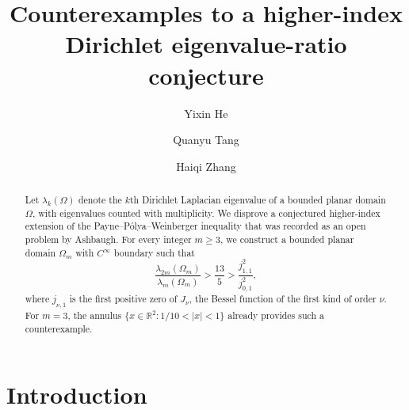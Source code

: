 \documentclass[11pt,letterpaper,reqno]{amsart}
\theoremstyle{definition}
\begin{document}
\title[Higher-index Dirichlet eigenvalue ratios]{Counterexamples to a higher-index Dirichlet eigenvalue-ratio conjecture}

\author[Y.~He]{Yixin He}
\address{School of Mathematical Sciences, Fudan University,
Shanghai 200433, P.~R.~China}

\author[Q.~Tang]{Quanyu Tang}
\address{School of Mathematical Sciences, University of Science and Technology
of China, Hefei 230026, P.~R.~China}

\author[H.~Zhang]{Haiqi Zhang}
\address{School of Mathematics, Shandong University, Jinan 250100, P.~R.~China}



\begin{abstract}
Let $\lambda_k(\Omega)$ denote the $k$th Dirichlet Laplacian eigenvalue of a bounded planar domain $\Omega$, with eigenvalues counted with multiplicity.  We disprove a conjectured higher-index extension of the Payne--P\'olya--Weinberger inequality that was recorded as an open problem by Ashbaugh. For every integer $m\geq3$, we construct a bounded planar domain $\Omega_m$ with $C^\infty$ boundary such that
$$
\frac{\lambda_{2m}(\Omega_m)}{\lambda_m(\Omega_m)}
>\frac{13}{5}
>\frac{j_{1,1}^2}{j_{0,1}^2},
$$
where $j_{\nu,1}$ is the first positive zero of $J_\nu$, the Bessel function of the first kind of order $\nu$. For $m=3$, the annulus $\{x\in\mathbb{R}^2:1/10<|x|<1\}$ already provides such a counterexample.
\end{abstract}







\maketitle

\section{Introduction}
\end{document}
